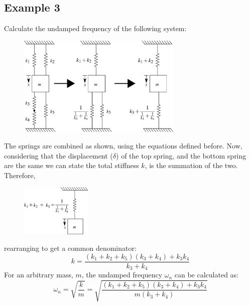 \documentclass[12pt,a4paper]{article}
\begin{document}
		\subsection*{Example 3}
			Calculate the undamped frequency of the following system:
			\begin{figure}[H]
				\centering
				\includegraphics[width=0.7\textwidth]{../../Figures/equivalent_mass_and_spring_system_1.png}
			\end{figure}	
			The springs are combined as shown, using the equations defined before.  Now, considering that the displacement ($\delta$) of the top spring, and the bottom spring are the same we can state the total stiffness $k$, is the summation of the two. Therefore,    
			\begin{figure}[H]
				\centering
				\includegraphics[width=0.3\textwidth]{../../Figures/equivalent_mass_and_spring_system_2.png}
			\end{figure}	
			rearranging to get a common denominator:
			\begin{equation}
				k= \frac{(k_1+k_2+k_5)(k_3+k_4)+k_3k_4}{k_3+k_4}  
			\end{equation}				
			For an arbitrary mass, $m$, the undamped frequency $\omega_n$ can be calculated as:
			\begin{equation}
				\omega_n = \sqrt{\frac{k}{m}} = \sqrt{\frac{(k_1+k_2+k_5)(k_3+k_4)+k_3k_4}{m(k_3+k_4)} }
			\end{equation}				

	 
			
			
\end{document}
